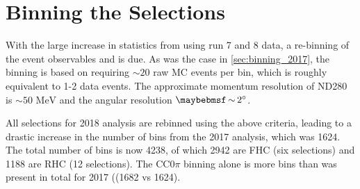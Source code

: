\section{Binning the Selections}
With the large increase in statistics from using run 7 and 8 data, a re-binning of the event observables \pmu and \cosmu is due. As was the case in \autoref{sec:binning_2017}, the binning is based on requiring $\sim20$ raw MC events per bin, which is roughly equivalent to 1-2 data events. The approximate momentum resolution of ND280 is $\sim50\text{ MeV}$ and the angular resolution $\sim2\degree$.

All selections for 2018 analysis are rebinned using the above criteria, leading to a drastic increase in the number of bins from the 2017 analysis, which was 1624. The total number of bins is now 4238, of which 2942 are FHC (six selections) and 1188 are RHC (12 selections). The CC0$\pi$ binning alone is more bins than was present in total for 2017 ((1682 vs 1624).

